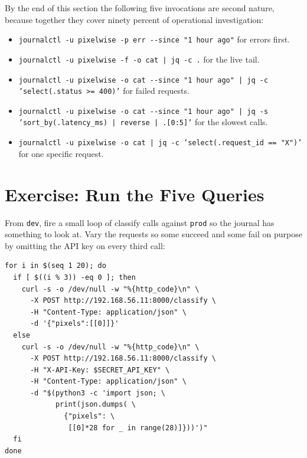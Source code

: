 
By the end of this section the following five invocations are second
nature, because together they cover ninety percent of operational
investigation:
\begin{itemize}
    \item \texttt{journalctl -u pixelwise -p err -{}-since "1 hour ago"} for errors first.
    \item \texttt{journalctl -u pixelwise -f -o cat | jq -c .} for the live tail.
    \item \texttt{journalctl -u pixelwise -o cat -{}-since "1 hour ago" | jq -c 'select(.status >= 400)'} for failed requests.
    \item \texttt{journalctl -u pixelwise -o cat -{}-since "1 hour ago" | jq -s 'sort\_by(.latency\_ms) | reverse | .[0:5]'} for the slowest calls.
    \item \texttt{journalctl -u pixelwise -o cat | jq -c 'select(.request\_id == "X")'} for one specific request.
\end{itemize}



\newpage
\section{Exercise: Run the Five Queries}

 From \texttt{dev}, fire a
small loop of classify calls against \texttt{prod} so the journal has
something to look at. Vary the requests so some succeed and some fail
on purpose by omitting the API key on every third call:

\begin{verbatim}
for i in $(seq 1 20); do
  if [ $((i % 3)) -eq 0 ]; then
    curl -s -o /dev/null -w "%{http_code}\n" \
      -X POST http://192.168.56.11:8000/classify \
      -H "Content-Type: application/json" \
      -d '{"pixels":[[0]]}'
  else
    curl -s -o /dev/null -w "%{http_code}\n" \
      -X POST http://192.168.56.11:8000/classify \
      -H "X-API-Key: $SECRET_API_KEY" \
      -H "Content-Type: application/json" \
      -d "$(python3 -c 'import json; \
            print(json.dumps( \
              {"pixels": \
               [[0]*28 for _ in range(28)]}))')"
  fi
done
\end{verbatim}

